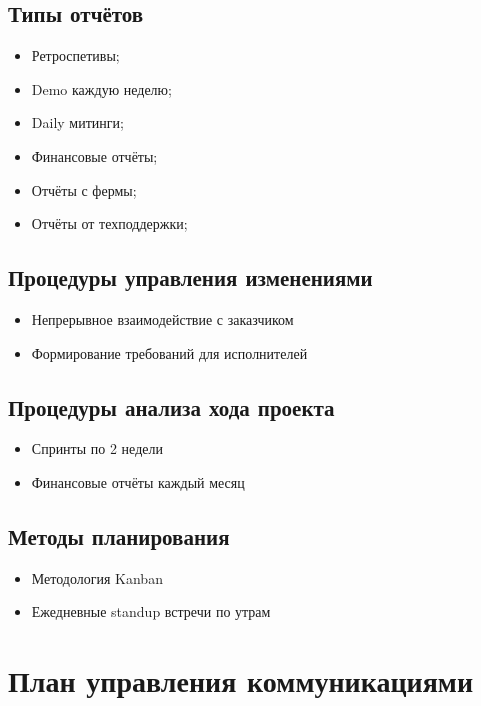 \documentclass[a4paper,10pt]{article}
\begin{document}
\subsection{Типы отчётов}

    \begin{itemize}
        \item Ретроспетивы;
        \item Demo каждую неделю;
        \item Daily митинги;
        \item Финансовые отчёты;
        \item Отчёты с фермы;
        \item Отчёты от техподдержки;
    \end{itemize}


\subsection{Процедуры управления изменениями}

    \begin{itemize}
        \item Непрерывное взаимодействие с заказчиком
        \item Формирование требований для исполнителей
    \end{itemize}

\subsection{Процедуры анализа хода проекта}

    \begin{itemize}
        \item Спринты по 2 недели
        \item Финансовые отчёты каждый месяц
    \end{itemize}

\subsection{Методы планирования}

    \begin{itemize}
        \item Методология Kanban
        \item Ежедневные standup встречи по утрам
    \end{itemize}

\section{План управления коммуникациями}
\end{document}
